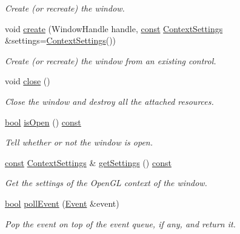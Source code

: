 \begin{DoxyCompactItemize}
\begin{DoxyCompactList}\small\item\em Create (or recreate) the window. \end{DoxyCompactList}\item 
void \hyperlink{classsf_1_1_window_acf67483dc21f08d65c8835b3889b41b2}{create} (Window\-Handle handle, \hyperlink{term__entry_8h_a57bd63ce7f9a353488880e3de6692d5a}{const} \hyperlink{structsf_1_1_context_settings}{Context\-Settings} \&settings=\hyperlink{structsf_1_1_context_settings}{Context\-Settings}())
\begin{DoxyCompactList}\small\item\em Create (or recreate) the window from an existing control. \end{DoxyCompactList}\item 
void \hyperlink{classsf_1_1_window_a99d1e030387b0c26f5995670504fe7b5}{close} ()
\begin{DoxyCompactList}\small\item\em Close the window and destroy all the attached resources. \end{DoxyCompactList}\item 
\hyperlink{term__entry_8h_a002004ba5d663f149f6c38064926abac}{bool} \hyperlink{classsf_1_1_window_a5aa9c2b2b0e51d3423c2b66c80253337}{is\-Open} () \hyperlink{term__entry_8h_a57bd63ce7f9a353488880e3de6692d5a}{const} 
\begin{DoxyCompactList}\small\item\em Tell whether or not the window is open. \end{DoxyCompactList}\item 
\hyperlink{term__entry_8h_a57bd63ce7f9a353488880e3de6692d5a}{const} \hyperlink{structsf_1_1_context_settings}{Context\-Settings} \& \hyperlink{classsf_1_1_window_a5a9d5c15facf25ad4d9b2b30caa0a2db}{get\-Settings} () \hyperlink{term__entry_8h_a57bd63ce7f9a353488880e3de6692d5a}{const} 
\begin{DoxyCompactList}\small\item\em Get the settings of the Open\-G\-L context of the window. \end{DoxyCompactList}\item 
\hyperlink{term__entry_8h_a002004ba5d663f149f6c38064926abac}{bool} \hyperlink{classsf_1_1_window_a338e996585faf82e93069858e3b531b7}{poll\-Event} (\hyperlink{classsf_1_1_event}{Event} \&event)
\begin{DoxyCompactList}\small\item\em Pop the event on top of the event queue, if any, and return it. \end{DoxyCompactList}\item 

\end{DoxyCompactItemize}
